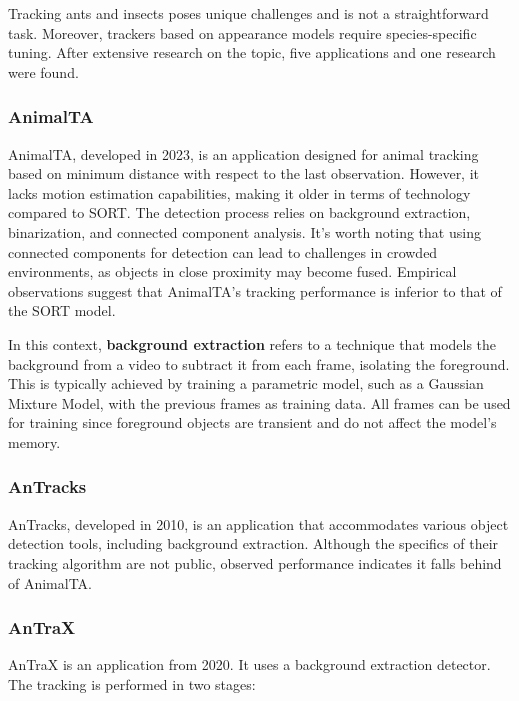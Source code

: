 
{
    Tracking ants and insects poses unique challenges and is not a straightforward task. 
    Moreover, trackers based on appearance models require species-specific tuning. 
    After extensive research on the topic, five applications and one research were found.
}

\subsubsection{AnimalTA}

{
    AnimalTA\cite{animalTA}, developed in 2023, is an application designed for animal tracking based on minimum distance with respect to the last observation. 
    However, it lacks motion estimation capabilities, making it older in terms of technology compared to SORT. 
    The detection process relies on background extraction, binarization, and connected component analysis. 
    It's worth noting that using connected components for detection can lead to challenges in crowded environments, as objects in close proximity may become fused. 
    Empirical observations suggest that AnimalTA's tracking performance is inferior to that of the SORT model.
}

{
    In this context, \textbf{background extraction} refers to a technique that models the background from a video to subtract it from each frame, isolating the foreground. 
    This is typically achieved by training a parametric model, such as a Gaussian Mixture Model, with the previous frames as training data. 
    All frames can be used for training since foreground objects are transient and do not affect the model's memory.
}

\subsubsection{AnTracks}

{
    AnTracks\cite{anTracks}, developed in 2010, is an application that accommodates various object detection tools, including background extraction. 
    Although the specifics of their tracking algorithm are not public, observed performance indicates it falls behind of AnimalTA.
}

\subsubsection{AnTraX}

    
{
    AnTraX\cite{anTraX} is an application from 2020. It uses a background extraction detector. 
    The tracking is performed in two stages: 
}

